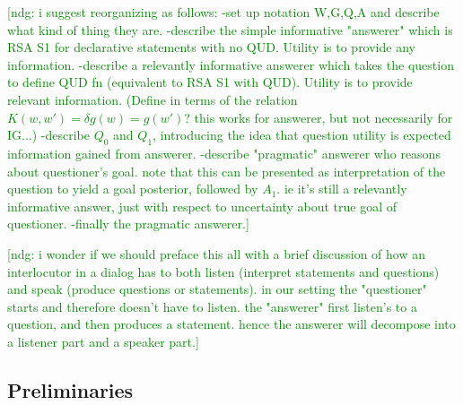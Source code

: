 \documentclass[12pt, floatsintext, jou]{apa6}
\newcommand{\ndg}[1]{\textcolor{Green}{[ndg: #1]}}
\begin{document}
\ndg{i suggest reorganizing as follows:
-set up notation W,G,Q,A and describe what kind of thing they are.
-describe the simple informative "answerer" which is RSA S1 for declarative statements with no QUD. Utility is to provide any information.
-describe a relevantly informative answerer which takes the question to define QUD fn (equivalent to RSA S1 with QUD). Utility is to provide relevant information. (Define in terms of the relation $K(w,w')=\delta{g(w)=g(w')}$? this works for answerer, but not necessarily for IG...)
-describe $Q_0$ and $Q_1$, introducing the idea that question utility is expected information gained from answerer.
-describe "pragmatic" answerer who reasons about questioner's goal. note that this can be presented as interpretation of the question to yield a goal posterior, followed by $A_1$. ie it's still a relevantly informative answer, just with respect to uncertainty about true goal of questioner.
-finally the pragmatic answerer.}

\ndg{i wonder if we should preface this all with a brief discussion of how an interlocutor in a dialog has to both listen (interpret statements and questions) and speak (produce questions or statements). in our setting the "questioner" starts and therefore doesn't have to listen. the "answerer" first listen's to a question, and then produces a statement. hence the answerer will decompose into a listener part and a speaker part.}


\subsection{Preliminaries}
\end{document}
